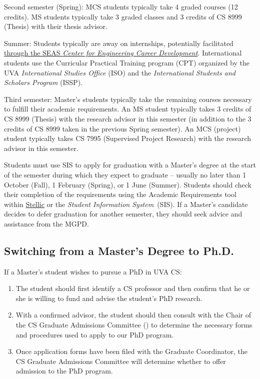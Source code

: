 {Second semester (Spring):} MCS students typically take 4 graded courses
(12 credits). MS students typically take 3 graded classes and 3 credits
of CS 8999 (Thesis) with their thesis advisor.

{Summer:} Students typically are away on internships, potentially
facilitated
\href{https://engineering.virginia.edu/about/offices/center-engineering-career-development}{through
the SEAS \emph{Center for Engineering Career Development}}.
International students use the Curricular Practical Training program (CPT) organized
by the UVA \emph{International Studies Office} (ISO) and the
\emph{International Students and Scholars Program} (ISSP).

{Third semester:} Master's students typically take the remaining courses
necessary to fulfill their academic requirements. An MS student
typically takes 3 credits of CS 8999 (Thesis) with the research advisor
in this semester (in addition to the 3 credits of CS 8999 taken in the
previous Spring semester). An MCS (project) student typically takes CS
7995 (Supervised Project Research) with the research advisor in this
semester.

Students must use SIS to apply for graduation with a Master's degree at
the start of the semester during which they expect to graduate --
usually no later than 1 October (Fall), 1 February (Spring), or 1 June
(Summer). Students should check their completion of the requirements
using the Academic Requirements tool within \href{https://login.stellic.virginia.edu/}{Stellic} or the \emph{Student
Information System}~(SIS).
If a Master's candidate decides to defer graduation for another semester, they should seek advice and assistance from the MGPD.


\hypertarget{ms-to-phd}{
\subsection{Switching from a Master's Degree to Ph.D.}
\label{ms-to-phd}
}

If a Master's student wishes to pursue a PhD in UVA CS:

\begin{enumerate}[nosep]
\item The student should first identify a CS professor and then confirm that he or she
      is willing to fund and advise the student's PhD research.

\item With a confirmed advisor, the student should then consult with the Chair of the
      CS Graduate Admissions Committee () to determine the
      necessary forms and procedures used to apply to our PhD program.

\item Once application forms have been filed with the Graduate Coordinator, the CS Graduate Admissions
      Committee will determine whether to offer admission to the PhD
      program.
\end{enumerate}

